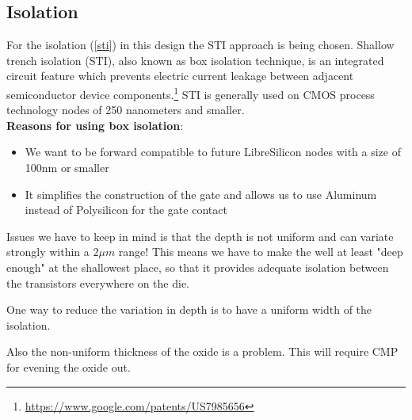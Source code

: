 \subsection{Isolation}
For the isolation (\autoref{sti})  in this design the STI approach is being chosen.
Shallow trench isolation (STI), also known as box isolation technique, is an integrated circuit feature which prevents electric current leakage between adjacent semiconductor device components.\footnote{\url{https://www.google.com/patents/US7985656}}
STI is generally used on CMOS process technology nodes of 250 nanometers and smaller.\\

\textbf{Reasons for using box isolation}:\begin{itemize}
\item We want to be forward compatible to future LibreSilicon nodes with a size of 100nm or smaller
\item It simplifies the construction of the gate and allows us to use Aluminum instead of Polysilicon for the gate contact
\end{itemize}

Issues we have to keep in mind is that the depth is not uniform and can variate strongly within a $2 \mu m$ range!
This means we have to make the well at least "deep enough" at the shallowest place, so that it provides adequate isolation between the transistors everywhere on the die.

One way to reduce the variation in depth is to have a uniform width of the isolation.

Also the non-uniform thickness of the oxide is a problem. This will require CMP for evening the oxide out.